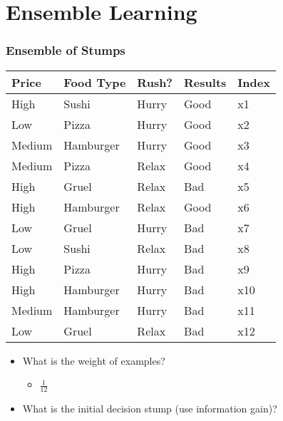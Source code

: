 \documentclass[compress, 9pt]{beamer}
\begin{document}
\section{Ensemble Learning}
\label{sec-3}
\begin{frame}
\frametitle{Ensemble of Stumps}
\label{sec-3-1}

\small

\begin{center}
\begin{tabular}{lllll}
\hline
 Price   &  Food Type  &  Rush?  &  Results  &  Index  \\
\hline
 High    &  Sushi      &  Hurry  &  Good     &  x1     \\
 Low     &  Pizza      &  Hurry  &  Good     &  x2     \\
 Medium  &  Hamburger  &  Hurry  &  Good     &  x3     \\
 Medium  &  Pizza      &  Relax  &  Good     &  x4     \\
 High    &  Gruel      &  Relax  &  Bad      &  x5     \\
 High    &  Hamburger  &  Relax  &  Good     &  x6     \\
 Low     &  Gruel      &  Hurry  &  Bad      &  x7     \\
 Low     &  Sushi      &  Relax  &  Bad      &  x8     \\
 High    &  Pizza      &  Hurry  &  Bad      &  x9     \\
 High    &  Hamburger  &  Hurry  &  Bad      &  x10    \\
 Medium  &  Hamburger  &  Hurry  &  Bad      &  x11    \\
 Low     &  Gruel      &  Relax  &  Bad      &  x12    \\
\hline
\end{tabular}
\end{center}
\begin{itemize}

\item <2-> What is the weight of examples?
\label{sec-3-1-1}%
\begin{itemize}

\item <3-> $\frac{1}{12}$
\label{sec-3-1-1-1}%
\end{itemize} %

\item <4-> What is the initial decision stump (use information gain)?
\label{sec-3-1-2}%
\begin{itemize}


\end{itemize}
\end{itemize}
\end{frame}
\end{document}

